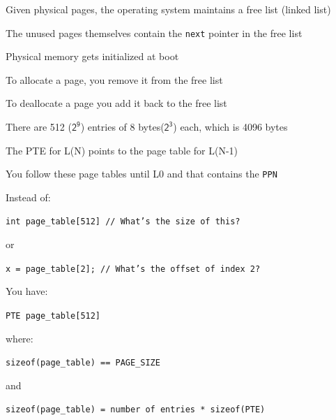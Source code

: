   \begin{slide}


    Given physical pages, the operating system maintains a free list (linked
    list)
    \medskip

    The unused pages themselves contain the \texttt{next} pointer in the free list

    \leftspace{}Physical memory gets initialized at boot
    \medskip

    To allocate a page, you remove it from the free list

    \leftspace{}To deallocate a page you add it back to the free list

  \end{slide}

  \begin{slide}


    There are 512 ($\mathsf{2^9}$) entries of 8 bytes($\mathsf{2^3}$) each,
    which is 4096 bytes
    \medskip

    The PTE for L(N) points to the page table for L(N-1)
    \medskip

    You follow these page tables until L0 and that contains the \texttt{PPN}

  \end{slide}

  \begin{slide}
    

    Instead of:

    \leftspace{}\texttt{int page_table[512] // What's the size of this?}

    or

    \leftspace{}%
    \texttt{x = page_table[2]; // What's the offset of index 2?}
    \medskip

    You have:

    \leftspace{}\texttt{PTE page_table[512]}

    where:

    \leftspace{}\texttt{sizeof(page_table) == PAGE_SIZE}

    and

    \leftspace{}%
    \texttt{sizeof(page_table) = number of entries * sizeof(PTE)}

  \end{slide}

